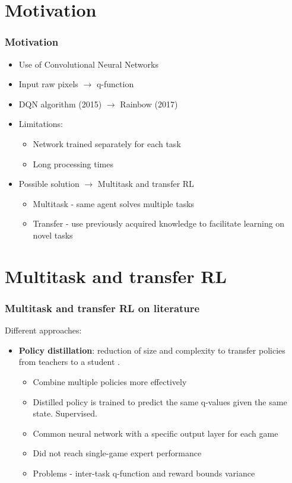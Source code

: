 \documentclass{beamer}
\theoremstyle{remark}
\theoremstyle{plain}
\begin{document}
\section{Motivation}
\label{sec:motivation}
\begin{frame}
  \frametitle{Motivation}
\begin{itemize}
    \item Use of Convolutional Neural Networks
    \item Input raw pixels $\xrightarrow{}$ q-function
    \item DQN algorithm (2015) $\xrightarrow{}$ Rainbow (2017)
    \item Limitations:
    \begin{itemize}
        \item Network trained separately for each task
        \item Long processing times
    \end{itemize}
    \item Possible solution $\xrightarrow{}$ Multitask and transfer RL
    \begin{itemize}
        \item Multitask - same agent solves multiple tasks
        \item Transfer - use previously acquired knowledge to facilitate learning on novel tasks
    \end{itemize}
\end{itemize}




\end{frame}

\section{Multitask and transfer RL}
\label{sec:multi}
\begin{frame}
  \frametitle{Multitask and transfer RL on literature}
Different approaches:\\
\vspace{1cm}
\begin{itemize}
    \item \textbf{Policy distillation}: reduction of size and complexity to transfer policies from teachers to a student \cite{RusuPOLICYDISTILLATION}.
    \begin{itemize}
        \item Combine multiple policies more effectively
        \item Distilled policy is trained to predict the same q-values given the same state. Supervised.
        \item Common neural network with a specific output layer for each game
        \item Did not reach single-game expert performance
        \item Problems - inter-task q-function and reward bounds variance
    \end{itemize} 
\end{itemize}
 \end{frame}
 
\end{document}
